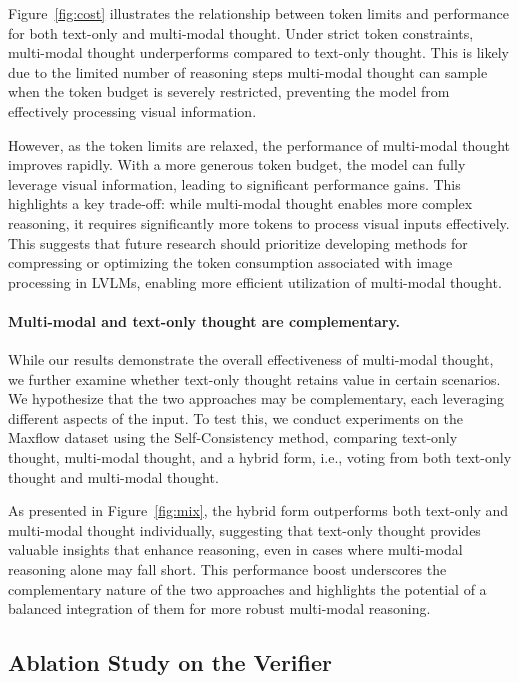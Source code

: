 Figure~\ref{fig:cost} illustrates the relationship between token limits and performance for both text-only and multi-modal thought. Under strict token constraints, multi-modal thought underperforms compared to text-only thought. This is likely due to the limited number of reasoning steps multi-modal thought can sample when the token budget is severely restricted, preventing the model from effectively processing visual information.

However, as the token limits are relaxed, the performance of multi-modal thought improves rapidly. With a more generous token budget, the model can fully leverage visual information, leading to significant performance gains. This highlights a key trade-off: while multi-modal thought enables more complex reasoning, it requires significantly more tokens to process visual inputs effectively. This suggests that future research should prioritize developing methods for compressing or optimizing the token consumption associated with image processing in LVLMs, enabling more efficient utilization of multi-modal thought.





\paragraph{Multi-modal and text-only thought are complementary.}

While our results demonstrate the overall effectiveness of multi-modal thought, we further examine whether text-only thought retains value in certain scenarios. We hypothesize that the two approaches may be complementary, each leveraging different aspects of the input. To test this, we conduct experiments on the Maxflow dataset using the Self-Consistency method, comparing text-only thought, multi-modal thought, and a hybrid form, i.e., voting from both text-only thought and multi-modal thought.

As presented in Figure~\ref{fig:mix}, the hybrid form outperforms both text-only and multi-modal thought individually, suggesting that text-only thought provides valuable insights that enhance reasoning, even in cases where multi-modal reasoning alone may fall short. This performance boost underscores the complementary nature of the two approaches and highlights the potential of a balanced integration of them for more robust multi-modal reasoning.



\subsection{Ablation Study on the Verifier}


